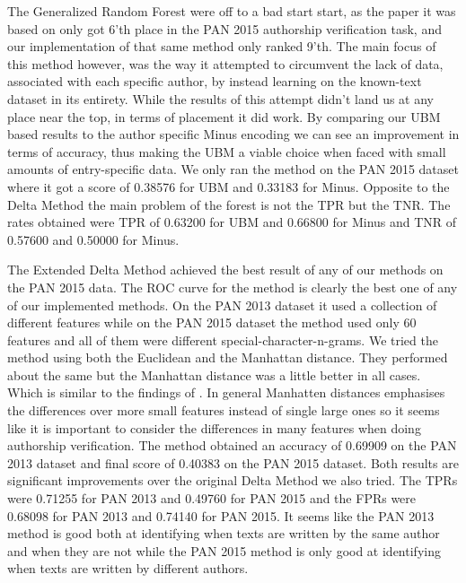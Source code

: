 The Generalized Random Forest were off to a bad start start, as the paper it
was based on \cite{pacheco2015} only got 6'th place in the PAN 2015 authorship
verification task, and our implementation of that same method only ranked 9'th.
The main focus of this method however, was the way it attempted to circumvent
the lack of data, associated with each specific author, by instead learning
on the known-text dataset in its entirety. While the results of this attempt
didn't land us at any place near the top, in terms of placement it did work. By
comparing our \gls{UBM} based results to the author specific Minus encoding we
can see an improvement in terms of accuracy, thus making the \gls{UBM} a viable
choice when faced with small amounts of entry-specific data. We only ran the
method on the PAN 2015 dataset where it got a score of 0.38576 for \gls{UBM} and
0.33183 for Minus. Opposite to the Delta Method the main problem of the forest
is not the \gls{TPR} but the \gls{TNR}. The rates obtained were \gls{TPR} of
0.63200 for \gls{UBM} and 0.66800 for Minus and \gls{TNR} of 0.57600 and 0.50000
for Minus. %

The Extended Delta Method achieved the best result of any of our methods on
the PAN 2015 data. The ROC curve for the method is clearly the best one of
any of our implemented methods. On the PAN 2013 dataset it used a collection
of different features while on the PAN 2015 dataset the method used only 60
features and all of them were different special-character-n-grams. We tried the
method using both the Euclidean and the Manhattan distance. They performed about
the same but the Manhattan distance was a little better in all cases. Which
is similar to the findings of \cite{evert2015towards}. In general Manhatten
distances emphasises the differences over more small features instead of single
large ones so it seems like it is important to consider the differences in many
features when doing authorship verification. The method obtained an accuracy
of 0.69909 on the PAN 2013 dataset and final score of 0.40383 on the PAN 2015
dataset. Both results are significant improvements over the original Delta
Method we also tried. The \gls{TPR}s were 0.71255 for PAN 2013 and 0.49760 for
PAN 2015 and the \gls{FPR}s were 0.68098 for PAN 2013 and 0.74140 for PAN 2015.
It seems like the PAN 2013 method is good both at identifying when texts are
written by the same author and when they are not while the PAN 2015 method is
only good at identifying when texts are written by different authors.


